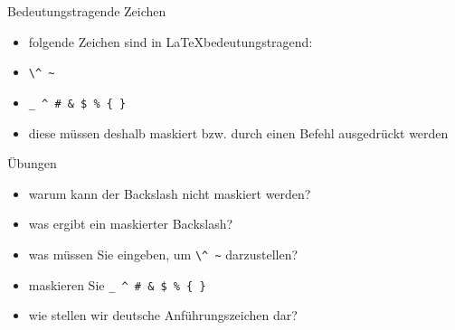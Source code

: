 

\begin{frame}[fragile]{Bedeutungstragende Zeichen}
    \begin{itemize}
        \item folgende Zeichen sind in \LaTeX bedeutungstragend:
        \item \texttt{\textbackslash \textasciicircum{} \textasciitilde{}}
        \item \lstinline|_ ^ # & $ % { }|
        \item diese müssen deshalb maskiert bzw. durch einen Befehl ausgedrückt werden
    \end{itemize}
\end{frame}

\begin{frame}[fragile]{Übungen}
    \begin{itemize}
        \item warum kann der Backslash nicht maskiert werden?
        \item was ergibt ein maskierter Backslash?
        \item was müssen Sie eingeben, um \texttt{\textbackslash \textasciicircum{} \textasciitilde{}} darzustellen?
        \item maskieren Sie \lstinline|_ ^ # & $ % { }|
        \item wie stellen wir deutsche Anführungszeichen dar?
    \end{itemize}
\end{frame}

